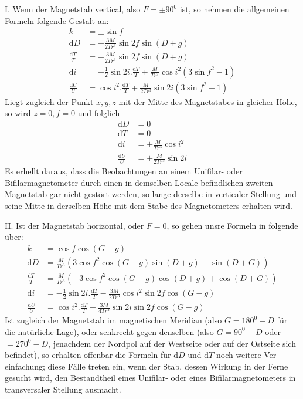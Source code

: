 I. Wenn der Magnetstab vertical, also $F=\pm90^0$ ist, so nehmen die allgemeinen Formeln folgende Gestalt an:
\[
\begin{aligned}
k&=\pm\sin f\\
\mathrm{d}D&=\pm\frac{3M}{2Tr^3}\sin2f\sin(D+g)\\
\frac{\mathrm{d}T}{T}&=\mp\frac{3M}{2Tr^3}\sin2f\sin(D+g)\\
\mathrm{d}i&=-\tfrac12\sin2i.\frac{\mathrm{d}T}{T}\mp\frac{M}{Tr^3}\cos i^2(3\sin f^2-1)\\
\frac{\mathrm{d}U}{U}&=\cos i^2.\frac{\mathrm{d}T}{T}\mp\frac{M}{2Tr^3}\sin2i(3\sin f^2-1)
\end{aligned}
\]
Liegt zugleich der Punkt $x,y,z$ mit der Mitte des Magnetstabes in gleicher Höhe, so wird $z=0,f=0$ und folglich
\[
\begin{aligned}
\mathrm{d}D&=0\\
\mathrm{d}T&=0\\
\mathrm{d}i&=\pm\frac{M}{Tr^3}\cos i^2\\
\frac{\mathrm{d}U}{U}&=\pm\frac{M}{2Tr^3}\sin2i
\end{aligned}
\]
Es erhellt daraus, dass die Beobachtungen an einem Unifilar- oder Bifilarmagnetometer durch einen in demselben Locale befindlichen zweiten Magnetstab gar nicht gestört werden, so lange derselbe in verticaler Stellung und seine Mitte in derselben Höhe mit dem Stabe des Magnetometers erhalten wird.

II. Ist der Magnetstab horizontal, oder $F=0$, so gehen unsre Formeln in folgende über:
\[
\begin{aligned}
k&=\cos f\cos(G-g)\\
\mathrm{d}D&=\frac{M}{Tr^3}(3\cos f^2\cos(G-g)\sin(D+g)-\sin(D+G))\\
\frac{\mathrm{d}T}{T}&=\frac{M}{Tr^3}(-3\cos f^2\cos(G-g)\cos(D+g)+\cos(D+G))\\
\mathrm{d}i&=-\tfrac12\sin2i.\frac{\mathrm{d}T}{T}-\frac{3M}{2Tr^3}\cos i^2\sin2f\cos(G-g)\\
\frac{\mathrm{d}U}{U}&=\cos i^2.\frac{\mathrm{d}T}{T}-\frac{3M}{4Tr^3}\sin2i\sin2f\cos(G-g)
\end{aligned}
\]
Ist zugleich der Magnetstab im magnetischen Meridian (also $G=180^0-D$ für die natürliche Lage), oder senkrecht gegen denselben (also $G=90^0-D$ oder $=270^0-D$, jenachdem der Nordpol auf der Westseite oder auf der Ostseite sich befindet), so erhalten offenbar die Formeln für $\mathrm{d}D$ und $\mathrm{d}T$ noch weitere Ver%
einfachung; diese Fälle treten ein, wenn der Stab, dessen Wirkung in der Ferne gesucht wird, den Bestandtheil eines Unifilar- oder eines Bifilarmagnetometers in transversaler Stellung ausmacht.

